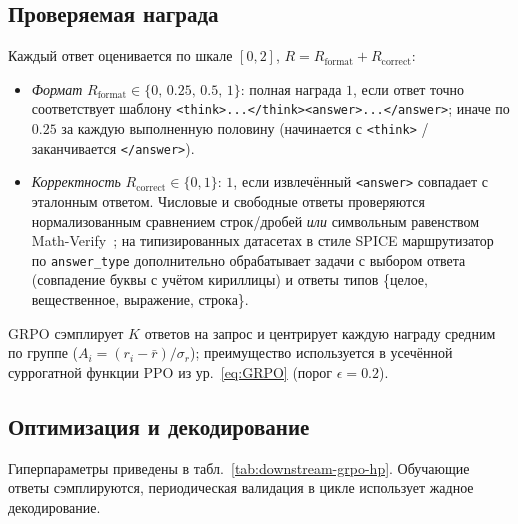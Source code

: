 \documentclass{article}
\begin{document}
\subsection{Проверяемая награда}
Каждый ответ оценивается по шкале $[0, 2]$, $R = R_{\text{format}} + R_{\text{correct}}$:
\begin{itemize}
  \item \emph{Формат} $R_{\text{format}}\in\{0,\,0.25,\,0.5,\,1\}$: полная награда $1$, если ответ точно соответствует шаблону \verb|<think>...</think><answer>...</answer>|; иначе по $0.25$ за каждую выполненную половину (начинается с \verb|<think>| / заканчивается \verb|</answer>|).
  \item \emph{Корректность} $R_{\text{correct}}\in\{0,1\}$: $1$, если извлечённый \verb|<answer>| совпадает с эталонным ответом. Числовые и свободные ответы проверяются нормализованным сравнением строк/дробей \emph{или} символьным равенством Math-Verify~\cite{mathverify}; на типизированных датасетах в стиле SPICE маршрутизатор по \texttt{answer\_type} дополнительно обрабатывает задачи с выбором ответа (совпадение буквы с учётом кириллицы) и ответы типов \{целое, вещественное, выражение, строка\}.
\end{itemize}
GRPO сэмплирует $K$ ответов на запрос и центрирует каждую награду средним по группе ($A_i = (r_i - \bar r)/\sigma_r$); преимущество используется в усечённой суррогатной функции PPO из ур.~\eqref{eq:GRPO} (порог $\epsilon = 0.2$).

\subsection{Оптимизация и декодирование}
Гиперпараметры приведены в табл.~\ref{tab:downstream-grpo-hp}. Обучающие ответы сэмплируются, периодическая валидация в цикле использует жадное декодирование.
\end{document}
